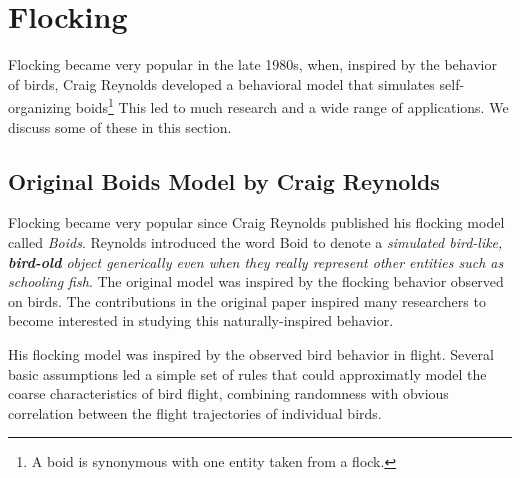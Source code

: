 





\section{Flocking}
Flocking became very popular in the late 1980s, when, inspired by the behavior of birds, Craig Reynolds developed a behavioral model that simulates self-organizing boids\footnote{A boid is synonymous with one entity taken from a flock.} This led to much research and a wide range of applications. We discuss some of these in this section.  

\subsection{Original Boids Model by Craig Reynolds}
Flocking became very popular since Craig Reynolds published his flocking model called \textit{Boids}\cite{craig1}. Reynolds introduced the word Boid to denote a \textit{simulated bird-like, \textbf{bird-old} object generically even when they really represent other entities such as schooling fish}. The original model was inspired by the flocking behavior observed on birds. The contributions in the original paper inspired many researchers to become interested in studying this naturally-inspired behavior.

His flocking model was inspired by the observed bird behavior in flight. Several basic assumptions led a simple set of rules that could approximatly model the coarse characteristics of bird flight, combining randomness with obvious correlation between the flight trajectories of individual birds.  

